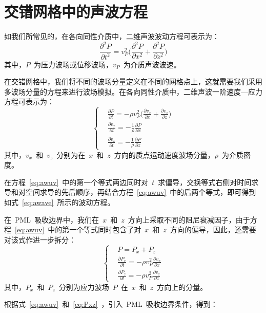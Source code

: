 \documentclass[UTF8]{ctexart}
\begin{document}
\section{交错网格中的声波方程}
如我们所常见的，在各向同性介质中，二维声波波动方程可表示为：
\begin{equation}\label{eq:awave}
\frac{\partial^2 P}{\partial t^2}=v_P^2\Big(\frac{\partial^2 P}{\partial x^2}+\frac{\partial^2 P}{\partial z^2}\Big)
\end{equation}
其中，$P$~为压力波场或位移波场，$v_P$~为介质声波波速。\par
在交错网格中，我们将不同的波场分量定义在不同的网格点上，这就需要我们采用多波场分量的方程来进行波场模拟。在各向同性介质中，二维声波一阶速度—应力方程可表示为：
\begin{equation}\label{eq:awuv}
\left\{ \begin{aligned}
& \frac{\partial P}{\partial t}=-\rho v_P^2 \big(\frac{\partial v_x}{\partial x}+\frac{\partial v_z}{\partial z} \big) \\
& \frac{\partial v_x}{\partial t}=-\frac{1}{\rho} \frac{\partial P}{\partial x} \\
& \frac{\partial v_z}{\partial t}=-\frac{1}{\rho} \frac{\partial P}{\partial z}
\end{aligned} \right.
\end{equation}
其中，$v_x$~和~$v_z$~分别为在~$x$~和~$z$~方向的质点运动速度波场分量，$\rho$~为介质密度。\par
在方程~\eqref{eq:awuv}~中的第一个等式两边同时对~$t$~求偏导，交换等式右侧对时间求导和对空间求导的先后顺序，再结合方程~\eqref{eq:awuv}~中的后两个等式，即可得到如式~\eqref{eq:awave}~所示的波动方程。\par
在~PML~吸收边界中，我们在~$x$~和~$z$~方向上采取不同的阻尼衰减因子，由于方程~\eqref{eq:awuv}~中的第一个等式同时包含了对~$x$~和~$z$~方向的偏导，因此，还需要对该式作进一步拆分：
\begin{equation}\label{eq:Pxz}
\left\{ \begin{aligned}
& P=P_x+P_z \\
& \frac{\partial P_x}{\partial t}=-\rho v_P^2 \frac{\partial v_x}{\partial x} \\
& \frac{\partial P_z}{\partial t}=-\rho v_P^2 \frac{\partial v_z}{\partial z}
\end{aligned} \right.
\end{equation}
其中，$P_x$~和~$P_z$~分别为应力波场~$P$~在~$x$~和~$z$~方向上的分量。\par
根据式~\eqref{eq:awuv}~和~\eqref{eq:Pxz}~，引入~PML~吸收边界条件，得到：
\end{document}
